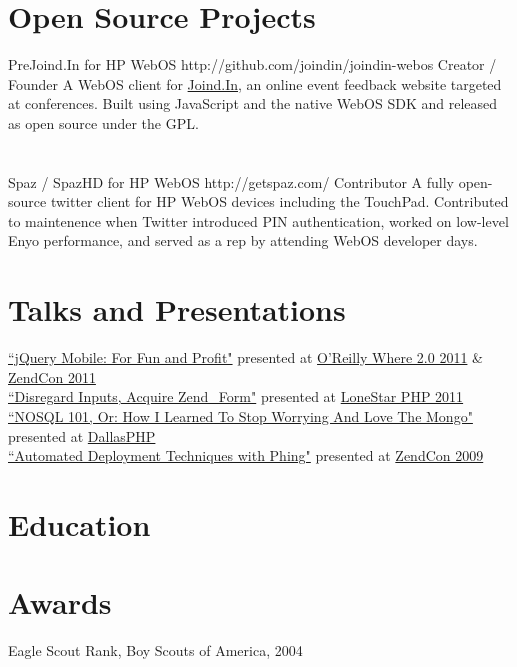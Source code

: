 \documentclass{resume}
\begin{document}
\section{Open Source Projects}

\project
	{PreJoind.In for HP WebOS}
	{http://github.com/joindin/joindin-webos}
	{Creator / Founder}
	{A WebOS client for \href{http://joind.in/}{Joind.In}, an online event feedback website targeted at conferences. Built using JavaScript and the native WebOS SDK and released as open source under the GPL.}
\\ \\ \\
\project
	{Spaz / SpazHD for HP WebOS}
	{http://getspaz.com/}
	{Contributor}
	{A fully open-source twitter client for HP WebOS devices including the TouchPad. Contributed to maintenence when Twitter introduced PIN authentication, worked on low-level Enyo performance, and served as a rep by attending WebOS developer days.}

\section{Talks and Presentations}

\begin{spacing}{1.25}
\href{http://www.slideshare.net/eljefe/jquery-mobile-for-fun-and-profit}{``jQuery Mobile: For Fun and Profit"} presented at \href{http://whereconf.com/where2011/public/schedule/speaker/110352}{O'Reilly Where 2.0 2011} \& \href{http://zendcon.com/2011/speaker/#4054}{ZendCon 2011}
\\
\href{http://www.slideshare.net/eljefe/disregard-inputs-acquire-zendform}{``Disregard Inputs, Acquire Zend\_Form"} presented at \href{http://lonestarphp.com/}{LoneStar PHP 2011}
\\
\href{http://www.slideshare.net/eljefe/automated-deployment-with-phing}{``NOSQL 101, Or: How I Learned To Stop Worrying And Love The Mongo"} presented at \href{http://http://dallasphp.org/}{DallasPHP}
\\
\href{http://www.slideshare.net/eljefe/automated-deployment-with-phing}{``Automated Deployment Techniques with Phing"} presented at \href{http://zendcon.com/2009/speakers#4054}{ZendCon 2009}
\end{spacing}

\section{Education}


\section{Awards}

Eagle Scout Rank, Boy Scouts of America, 2004
\end{document}
